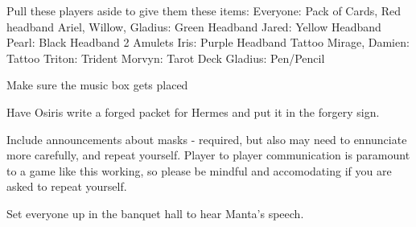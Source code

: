 \documentclass[green]{NeptuneBall}
\begin{document}
\name{\gChecklist{}}

Pull these players aside to give them these items:
Everyone: Pack of Cards, Red headband
Ariel, Willow, Gladius: Green Headband
Jared: Yellow Headband
Pearl: Black Headband
			2	Amulets
Iris: Purple Headband
			Tattoo
Mirage, Damien: Tattoo
Triton: Trident
Morvyn: Tarot Deck
Gladius: Pen/Pencil
	
Make sure the music box gets placed	

Have Osiris write a forged packet for Hermes and put it in the forgery sign.

Include announcements about masks - required, but also may need to ennunciate more carefully, and repeat yourself. Player to player communication is paramount to a game like this working, so please be mindful and accomodating if you are asked to repeat yourself.

Set everyone up in the banquet hall to hear Manta's speech.
\end{document}
